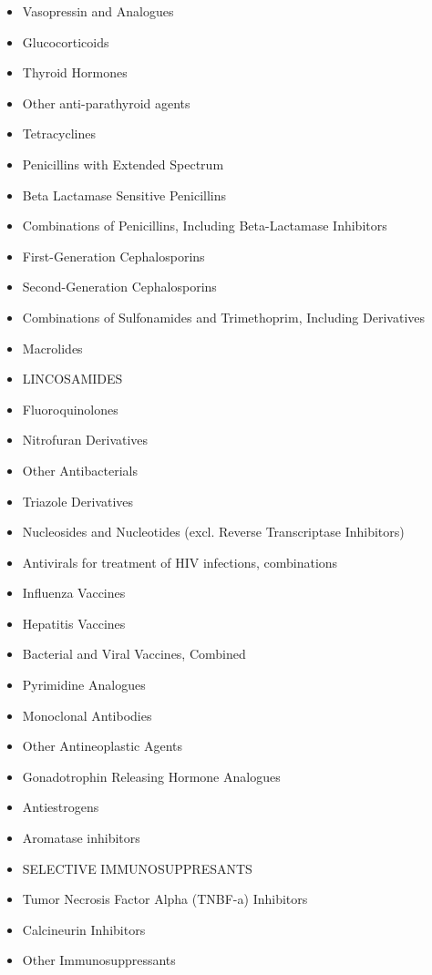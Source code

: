 \documentclass[a4paper,12pt]{article}
\begin{document}
\begin{appendices}
\begin{itemize}
   			\item Vasopressin and Analogues
   			\item Glucocorticoids
   			\item Thyroid Hormones
   			\item Other anti-parathyroid agents
   			\item Tetracyclines
   			\item Penicillins with Extended Spectrum
   			\item Beta Lactamase Sensitive Penicillins
   			\item Combinations of Penicillins, Including Beta-Lactamase Inhibitors
   			\item First-Generation Cephalosporins
   			\item Second-Generation Cephalosporins
   			\item Combinations of Sulfonamides and Trimethoprim, Including Derivatives
   			\item Macrolides
   			\item LINCOSAMIDES
   			\item Fluoroquinolones
   			\item Nitrofuran Derivatives
   			\item Other Antibacterials
   			\item Triazole Derivatives
   			\item Nucleosides and Nucleotides (excl. Reverse Transcriptase Inhibitors)
   			\item Antivirals for treatment of HIV infections, combinations
   			\item Influenza Vaccines
   			\item Hepatitis Vaccines
   			\item Bacterial and Viral Vaccines, Combined
   			\item Pyrimidine Analogues
   			\item Monoclonal Antibodies
   			\item Other Antineoplastic Agents
   			\item Gonadotrophin Releasing Hormone Analogues
   			\item Antiestrogens
   			\item Aromatase inhibitors
   			\item SELECTIVE IMMUNOSUPPRESANTS
   			\item Tumor Necrosis Factor Alpha (TNBF-a) Inhibitors
   			\item Calcineurin Inhibitors
   			\item Other Immunosuppressants

\end{itemize}
\end{appendices}
\end{document}
